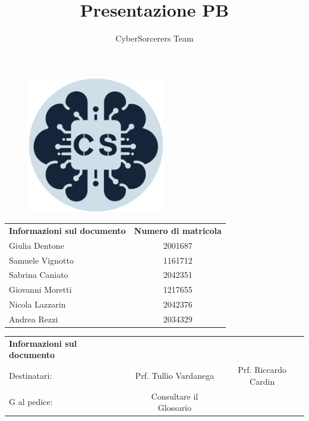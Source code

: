 \documentclass{article}
\title{\Huge{\textbf{Presentazione PB}}\vspace{-1em}}
\author{CyberSorcerers Team}
\date{}
\begin{document}
\maketitle
\vspace{-3em}
\begin{figure}[h]
  \centering
  \includegraphics[width=6cm, height=6cm]{documenti/logo rotondo.png}
  \label{fig:immagine}
\end{figure}

\begin{center}
    \begin{tabular}{l c }
        \rowcolor{Blue} 
        \textbf{Informazioni sul documento} & \textbf{Numero di matricola} \\ [1 ex]
        \rowcolor{LighterBlue}
        Giulia Dentone & 2001687\\ [1 ex]
        \rowcolor{LightBlue}
        Samuele Vignotto & 1161712 \\ [1 ex]
        \rowcolor{LighterBlue}
        Sabrina Caniato & 2042351\\ [1 ex]
        \rowcolor{LightBlue}
        Giovanni Moretti & 1217655 \\ [1 ex]
        \rowcolor{LighterBlue}
        Nicola Lazzarin & 2042376\\ [1 ex]
        \rowcolor{LightBlue}
        Andrea Rezzi & 2034329\\ [1 ex]
    \end{tabular}
\end{center}


\begin{center}
    \begin{tabular}{l c c}
        \rowcolor{Blue} 
        \textbf{Informazioni sul documento} & &\\ [1 ex]
        \rowcolor{LighterBlue}
        Destinatari: & Prf. Tullio Vardanega & Prf. Riccardo Cardin \\ [1 ex]
        \rowcolor{LightBlue}
        G al pedice: & Consultare il Glossario & \\ [1 ex]
    \end{tabular}
\end{center}
\newpage
\end{document}
